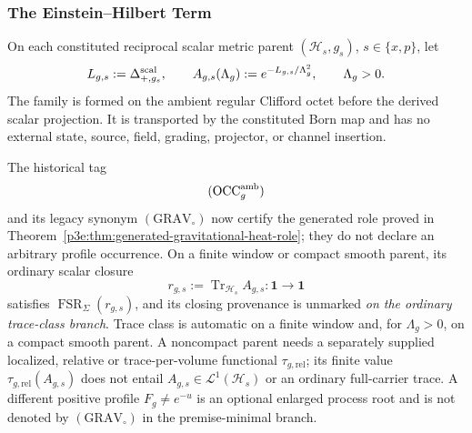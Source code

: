 \documentclass[12pt,a4paper]{article}
\begin{document}
\endgroup

\subsubsection{The Einstein--Hilbert Term}
\label{p3:sec:EH_term}

\begin{definition}
\label{p3e:def:grav-closed-occurrence}
On each constituted reciprocal scalar metric parent
\((\mathcal H_s,g_s)\), \(s\in\{x,p\}\), let
\[
 L_{g,s}:=\Delta_{+,g_s}^{\rm scal},\qquad
 A_{g,s}(\Lambda_g):=
 e^{-L_{g,s}/\Lambda_g^2},\qquad \Lambda_g>0.
\]
The family is formed on the ambient regular Clifford octet before the derived
scalar projection.  It is transported by the constituted Born map and has no
external state, source, field, grading, projector, or channel insertion.

The historical tag
\[
 (\mathrm{OCC}_{g}^{\rm amb})
\]
and its legacy synonym \((\mathrm{GRAV}_{\circ})\) now certify the generated
role proved in Theorem~\ref{p3e:thm:generated-gravitational-heat-role}; they
do not declare an arbitrary profile occurrence.  On a finite window or compact smooth parent, its ordinary scalar closure
\[
 r_{g,s}:=\operatorname{Tr}_{\mathcal H_s}A_{g,s}:
 \mathbf1\to\mathbf1
\]
satisfies \(\operatorname{FSR}_{\Sigma}(r_{g,s})\), and its closing
provenance is unmarked \emph{on the ordinary trace-class branch}.
Trace class is automatic on a finite window and, for $\Lambda_g>0$,
on a compact smooth parent.  A noncompact parent needs a separately supplied
localized, relative or trace-per-volume functional $\tau_{g,\mathrm{rel}}$;
its finite value $\tau_{g,\mathrm{rel}}(A_{g,s})$ does not entail
$A_{g,s}\in\mathcal L^1(\mathcal H_s)$ or an ordinary full-carrier trace.  A different positive profile
\(F_g\ne e^{-u}\) is an optional enlarged process root and is not denoted by
\((\mathrm{GRAV}_{\circ})\) in the premise-minimal branch.
\end{definition}
\end{document}
